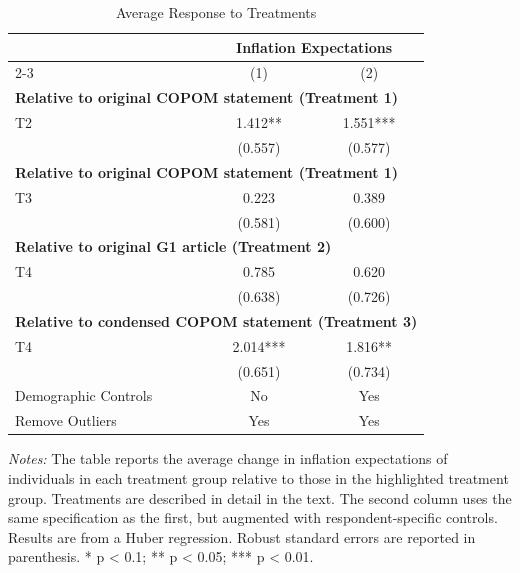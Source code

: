 
\begin{table}[H]
\centering
\caption{Average Response to Treatments}
\label{tab:3}
\begin{tabular}{lcc}
\toprule
\textbf{} & \multicolumn{2}{c}{\textbf{Inflation Expectations}}\\ 
\cmidrule(lr){2-3}
& (1) & (2) \\ 
\midrule
\multicolumn{3}{l}{\textbf{Relative to original COPOM statement (Treatment 1)}} \\
T2 & 1.412** & 1.551*** \\
& (0.557) & (0.577) \\
\midrule
\multicolumn{3}{l}{\textbf{Relative to original COPOM statement (Treatment 1)}} \\
T3 & 0.223 & 0.389 \\
& (0.581) & (0.600) \\
\midrule
\multicolumn{3}{l}{\textbf{Relative to original G1 article (Treatment 2)}} \\
T4 & 0.785 & 0.620 \\
& (0.638) & (0.726) \\
\midrule
\multicolumn{3}{l}{\textbf{Relative to condensed COPOM statement (Treatment 3)}} \\
T4 & 2.014*** & 1.816** \\
& (0.651) & (0.734) \\
\midrule
Demographic Controls & No & Yes \\
Remove Outliers & Yes & Yes \\
\bottomrule
\end{tabular}
\begin{minipage}{\textwidth}
    {\fontsize{8}{8}\selectfont\textit{Notes:} The table reports the average change in inflation expectations of individuals in each treatment group relative to those in the highlighted treatment group. Treatments are described in detail in the text. The second column uses the same specification as the first, but augmented with respondent-specific controls. Results are from a Huber regression. Robust standard errors are reported in parenthesis. * p < 0.1; ** p < 0.05; *** p < 0.01.}
\end{minipage}
\end{table}
